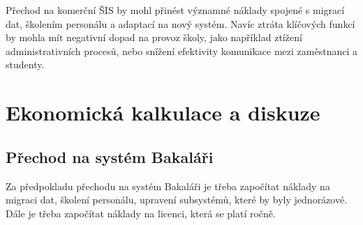 \documentclass[FM,Proj]{tulthesis}
\begin{document}
Přechod na komerční ŠIS by mohl přinést významné náklady spojené s migrací dat,
školením personálu a adaptací na nový systém. Navíc ztráta klíčových funkcí
by mohla mít negativní dopad na provoz školy, jako například ztížení administrativních
procesů, nebo snížení efektivity komunikace mezi zaměstnanci a studenty.

\section{Ekonomická kalkulace a diskuze}
\subsection{Přechod na systém Bakaláři}
Za předpokladu přechodu na systém Bakaláři je třeba započítat náklady na migraci dat,
školení personálu, upravení subsystémů, které by byly jednorázové. Dále je třeba 
započítat náklady na licenci, která se platí ročně.
\end{document}
